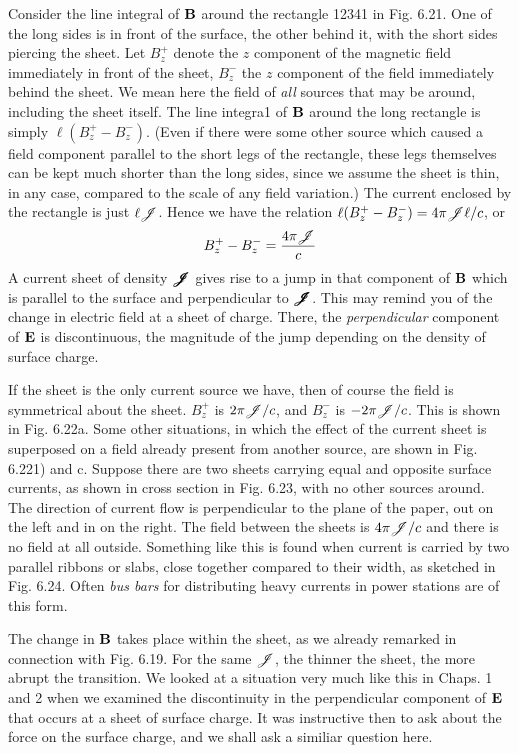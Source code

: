 Consider the line integral of $\mathbf{B}$ around the rectangle 12341 in
Fig. 6.21. One of the long sides is in front of the surface, the other
behind it, with the short sides piercing the sheet. Let $B_z^+$ denote the
$z$ component of the magnetic field immediately in front of the sheet,
$B_z^-$ the $z$ component of the field immediately behind the sheet. We
mean here the field of \emph{all} sources that may be around, including the
sheet itself. The line integra1 of $\mathbf{B}$ around the long rectangle is simply
$\ell(B_z^+-B_z^-)$. (Even if there were some other source which caused
a field component parallel to the short legs of the rectangle, these
legs themselves can be kept much shorter than the long sides, since
we assume the sheet is thin, in any case, compared to the scale of any
field variation.) The current enclosed by the rectangle is just $\ell\mathscr{J}$.
Hence we have the relation $\ell(B_z^+-B_z^-)=4\pi\mathscr{J}\ell/c$, or
\begin{equation}
  B_z^+-B_z^- = \frac{4\pi\mathscr{J}}{c}
\end{equation}
A current sheet of density $\pmb{\mathscr{J}}$ gives rise to a jump in that component
of $\mathbf{B}$ which is parallel to the surface and perpendicular to $\pmb{\mathscr{J}}$. This
may remind you of the change in electric field at a sheet of charge.
There, the \emph{perpendicular} component of $\mathbf{E}$ is discontinuous, the magnitude
of the jump depending on the density of surface charge.

If the sheet is the only current source we have, then of course the
field is symmetrical about the sheet. $B_z^+$ is $2\pi\mathscr{J}/c$, and $B_z^-$ is
$-2\pi\mathscr{J}/c$. This is shown in Fig. 6.22a. Some other situations, in
which the effect of the current sheet is superposed on a field already
present from another source, are shown in Fig. 6.221) and c. Suppose
there are two sheets carrying equal and opposite surface currents, as
shown in cross section in Fig. 6.23, with no other sources around.
The direction of current flow is perpendicular to the plane of the
paper, out on the left and in on the right. The field between the sheets
is $4\pi\mathscr{J}/c$ and there is no field at all outside. Something like this is
found when current is carried by two parallel ribbons or slabs, close
together compared to their width, as sketched in Fig. 6.24. Often \emph{bus
bars} for distributing heavy currents in power stations are of this form.

The change in $\mathbf{B}$ takes place within the sheet, as we already remarked
in connection with Fig. 6.19. For the same $\mathscr{J}$, the thinner
the sheet, the more abrupt the transition. We looked at a situation
very much like this in Chaps. 1 and 2 when we examined the discontinuity
in the perpendicular component of $\mathbf{E}$ that occurs at a sheet
of surface charge. It was instructive then to ask about the force on
the surface charge, and we shall ask a similiar question here.

